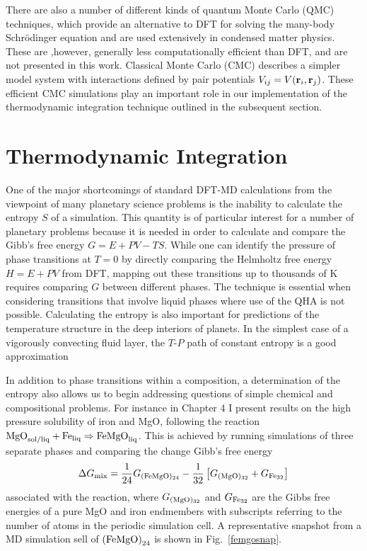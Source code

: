 There are also a number of different kinds of quantum Monte Carlo (QMC) techniques,
which provide an alternative to DFT for solving the many-body Schr\"{o}dinger
equation and are used extensively in condensed matter physics. These are ,however,
generally less computationally efficient than DFT, and are not presented in this
work. Classical Monte Carlo (CMC) describes a simpler model system with interactions
defined by pair potentials $V_{ij}=V({\bf r}_i,{\bf r}_j)$. These efficient CMC
simulations play an important role in our implementation of the thermodynamic
integration technique outlined in the subsequent section.

\section{Thermodynamic Integration}

One of the major shortcomings of standard DFT-MD calculations from the viewpoint of
many planetary science problems is the inability to calculate the entropy $S$ of a
simulation. This quantity is of particular interest for a number of planetary
problems because it is needed in order to calculate and compare the Gibb's free
energy $G=E+PV-TS$. While one can identify the pressure of phase transitions at $T=0$
by directly comparing the Helmholtz free energy $H=E+PV$ from DFT, mapping out these
transitions up to thousands of K requires comparing $G$ between different phases.
The technique is essential when considering transitions that involve liquid phases
where use of the QHA is not possible. Calculating the entropy is also important for
predictions of the temperature structure in the deep interiors of planets. In the
simplest case of a vigorously convecting fluid layer, the $T$-$P$ path of constant
entropy is a good approximation

In addition to phase transitions within a
composition, a determination of the entropy also allows us to begin addressing
questions of simple chemical and compositional problems. For instance in Chapter 4 I
present results on the high pressure solubility of iron and MgO, following the
reaction $\rm{MgO}_{\rm sol/liq} + \rm{Fe}_{\rm liq} \Rightarrow \rm{FeMgO}_{\rm
liq}$. This is achieved by running simulations of three separate phases and comparing
the change Gibb's free energy
%
\begin{equation} \label{eqn:gibbs1}
  \Delta G_{\rm{\rm mix}}  =  \frac{1}{24}G_{\rm{(FeMgO)_{24}}} 
- \frac{1}{32} \left[  G_{\rm{(MgO)_{32}}}  + G_{\rm{Fe_{32}}} \right]
\end{equation}
%
associated with the reaction, where $G_{\rm{(MgO)_{32}}}$ and   $G_{\rm{Fe_{32}}}$
are the Gibbs free energies of a pure MgO and iron endmembers with subscripts
referring to the number of atoms in the periodic simulation cell. A representative
snapshot from a MD simulation sell of ${\rm(FeMgO)}_{24}$ is shown in
Fig.~\ref{femgosnap}.

